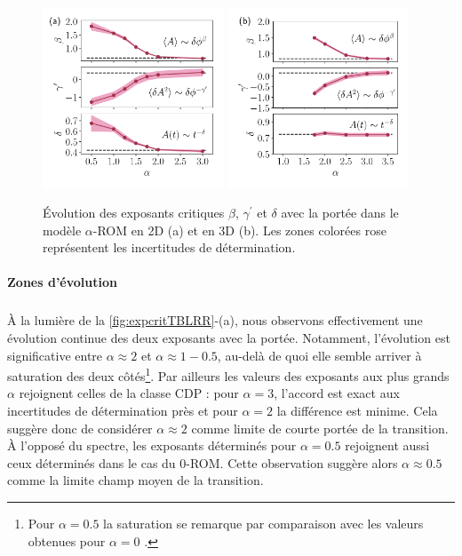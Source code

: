 \begin{figure}[h]
	\centering	\includegraphics[width=0.48\textwidth]{Chapitre3/Figures/BetaGamma/exp_suspensions.pdf}
	\includegraphics[width=0.48\textwidth]{Chapitre3/Figures/BetaGamma/exp_suspensions3D.pdf}
	\caption{Évolution des exposants critiques $\beta$, $\gamma^\prime$ et $\delta$  avec la portée dans le modèle $\alpha$-ROM en 2D (a) et en 3D (b). Les zones colorées rose représentent les incertitudes de détermination.}
	\label{fig:expcritTBLRR}
\end{figure}

\paragraph{Zones d'évolution}

\subparagraph{}\`A la lumière de la \autoref{fig:expcritTBLRR}-(a), nous observons effectivement une évolution continue des deux exposants avec la portée. Notamment, l'évolution est significative entre $\alpha\approx 2$ et $\alpha \approx 1-0.5$, au-delà de quoi elle semble arriver à saturation des deux côtés\footnote{Pour $\alpha = 0.5$ la saturation se remarque par comparaison avec les valeurs obtenues pour $\alpha = 0$ \cite{mari_absorbing_2022}.}. Par ailleurs les valeurs des exposants aux plus grands $\alpha$ rejoignent celles de la classe CDP : pour $\alpha=3$, l'accord est exact aux incertitudes de détermination près et pour $\alpha=2$ la différence est minime. Cela suggère donc de considérer $\alpha\approx 2$ comme limite de courte portée de la transition. \`A l'opposé du spectre, les exposants déterminés pour $\alpha = 0.5$ rejoignent aussi ceux déterminés dans le cas du $0$-ROM. Cette observation suggère alors $\alpha\approx 0.5$ comme la limite champ moyen de la transition. 

